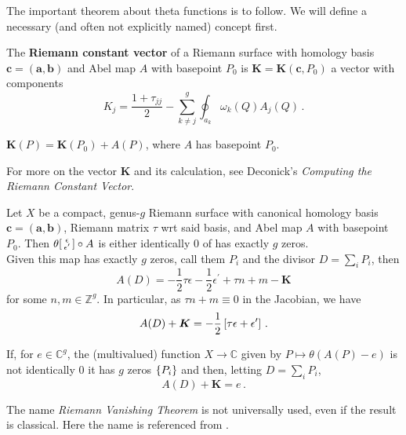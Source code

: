 \documentclass{article}
\begin{document}
The important theorem about theta functions is to follow. We will define a necessary (and often not explicitly named) concept first.

\begin{definition}
	The \textbf{Riemann constant vector} of a Riemann surface with homology basis $\bm{c} = (\bm{a},\bm{b})$ and Abel map $A$ with basepoint $P_0$ is  $\bm{K}=\bm{K}(\bm{c},P_0)$ a vector with components
	\[
	K_j = \frac{1+\tau_{jj}}{2} - \sum_{k \neq j}^g \oint_{a_k} \omega_k(Q) A_j(Q) \, .
	\]
\end{definition}

\begin{prop}
	$\bm{K}(P) = \bm{K}(P_0) + A(P)$, where $A$ has basepoint $P_0$. 
\end{prop}

\begin{remark}
	For more on the vector $\bm{K}$ and its calculation, see Deconick's \textit{Computing the Riemann Constant Vector}. 
\end{remark}

\begin{theorem}
	Let $X$ be a compact, genus-$g$ Riemann surface with canonical homology basis $\bm{c} = (\bm{a},\bm{b})$, Riemann matrix $\tau$ wrt said basis, and Abel map $A$ with basepoint $P_0$. Then $\theta\begin{bsmallmatrix} \epsilon \\ \epsilon^\prime \end{bsmallmatrix} \circ A$ is either identically $0$ of has exactly $g$ zeros.  \\
	Given this map has exactly $g$ zeros, call them $P_i$ and the divisor $D = \sum_i P_i$, then 
	\[
	A(D) = -\frac{1}{2}\tau \epsilon - \frac{1}{2}\epsilon^\prime + \tau n + m - \bm{K} 
	\]
	for some $n,m \in \mathbb{Z}^g$. In particular, as $\tau n +m \equiv 0$ in the Jacobian, we have 
	\[
	A(D)+\bm{K} = -\frac{1}{2}\left[ \tau \epsilon + \epsilon^\prime \right] \, .
	\]
\end{theorem}

\begin{corollary}
	If, for $e \in \mathbb{C}^g$, the (multivalued) function $X \to \mathbb{C}$ given by $P \mapsto \theta(A(P)-e)$ is not identically $0$ it has $g$ zeros $\left\{ P_i \right\}$ and then, letting $D=\sum_i P_i$,
	\[
	A(D)+\bm{K} = e \, .
	\]
\end{corollary}
\begin{remark}
	The name \textit{Riemann Vanishing Theorem} is not universally used, even if the result is classical. Here the name is referenced from \cite{Ercolani1989}. 
\end{remark}
\end{document}
